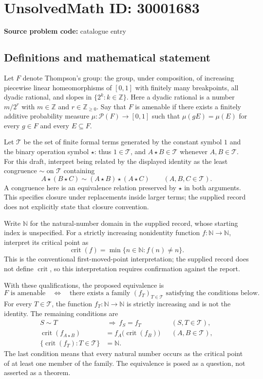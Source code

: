 \documentclass[11pt]{article}
\newcommand{\N}{\mathbb{N}}
\newcommand{\Z}{\mathbb{Z}}
\begin{document}
\section*{UnsolvedMath ID: 30001683}
\textbf{Source problem code:} catalogue entry
\subsection{Definitions and mathematical statement}
Let $F$ denote Thompson's group: the group, under composition, of increasing piecewise linear homeomorphisms of $[0,1]$ with finitely many breakpoints, all dyadic rational, and slopes in $\{2^k:k\in\Z\}$. Here a dyadic rational is a number $m/2^r$ with $m\in\Z$ and $r\in\Z_{\geq 0}$. Say that $F$ is amenable if there exists a finitely additive probability measure $\mu:\mathcal P(F)\to[0,1]$ such that $\mu(gE)=\mu(E)$ for every $g\in F$ and every $E\subseteq F$.

Let $\mathcal T$ be the set of finite formal terms generated by the constant symbol $1$ and the binary operation symbol $\star$: thus $1\in\mathcal T$, and $A\star B\in\mathcal T$ whenever $A,B\in\mathcal T$. For this draft, interpret being related by the displayed identity as the least congruence $\sim$ on $\mathcal T$ containing
\[
 A\star(B\star C)\sim (A\star B)\star(A\star C)
 \qquad(A,B,C\in\mathcal T).
\]
A congruence here is an equivalence relation preserved by $\star$ in both arguments. This specifies closure under replacements inside larger terms; the supplied record does not explicitly state that closure convention.

Write $\N$ for the natural-number domain in the supplied record, whose starting index is unspecified. For a strictly increasing nonidentity function $f:\N\to\N$, interpret its critical point as
\[
 \operatorname{crit}(f)=\min\{n\in\N:f(n)\ne n\}.
\]
This is the conventional first-moved-point interpretation; the supplied record does not define $\operatorname{crit}$, so this interpretation requires confirmation against the report.

With these qualifications, the proposed equivalence is
\[
 F\text{ is amenable}
 \quad\Longleftrightarrow\quad
 \text{there exists a family }(f_T)_{T\in\mathcal T}\text{ satisfying the conditions below}.
\]
For every $T\in\mathcal T$, the function $f_T:\N\to\N$ is strictly increasing and is not the identity. The remaining conditions are
\begin{align*}
 S\sim T&\ \Longrightarrow\ f_S=f_T
 &&(S,T\in\mathcal T),\\
 \operatorname{crit}(f_{A\star B})&=f_A\bigl(\operatorname{crit}(f_B)\bigr)
 &&(A,B\in\mathcal T),\\
 \{\operatorname{crit}(f_T):T\in\mathcal T\}&=\N.
\end{align*}
The last condition means that every natural number occurs as the critical point of at least one member of the family. The equivalence is posed as a question, not asserted as a theorem.
\end{document}
